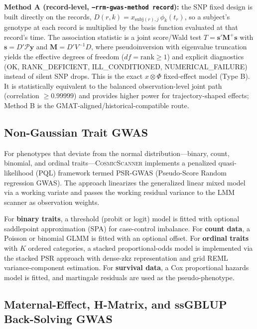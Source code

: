 \documentclass[11pt,a4paper]{article}
\newcommand{\CosmicScanner}{\textsc{CosmicScanner}}
\begin{document}
\textbf{Method A (record-level, \texttt{--rrm-gwas-method record}):} the SNP fixed design is built directly on the records, $D(r,k) = x_{\text{subj}(r),j}\,\phi_k(t_r)$, so a subject's genotype at each record is multiplied by the basis function evaluated at that record's time. The association statistic is a joint score/Wald test $T = \mathbf{s}'\mathbf{M}^{+}\mathbf{s}$ with $\mathbf{s} = D'\mathcal{P}\mathbf{y}$ and $\mathbf{M} = D'V^{-1}D$, where pseudoinversion with eigenvalue truncation yields the effective degrees of freedom ($df = \mathrm{rank} \geq 1$) and explicit diagnostics (OK, RANK\_DEFICIENT, ILL\_CONDITIONED, NUMERICAL\_FAILURE) instead of silent SNP drops. This is the exact $x \otimes \Phi$ fixed-effect model (Type B). It is statistically equivalent to the balanced observation-level joint path (correlation $\geq 0.99999$) and provides higher power for trajectory-shaped effects; Method B is the GMAT-aligned/historical-compatible route.

\subsection{Non-Gaussian Trait GWAS}
\label{sec:non_gaussian}

For phenotypes that deviate from the normal distribution---binary, count, binomial, and ordinal traits---\CosmicScanner{} implements a penalized quasi-likelihood (PQL) framework termed PSR-GWAS (Pseudo-Score Random regression GWAS). The approach linearizes the generalized linear mixed model via a working variate and passes the working residual variance to the LMM scanner as observation weights.

For \textbf{binary traits}, a threshold (probit or logit) model is fitted with optional saddlepoint approximation (SPA) for case-control imbalance. For \textbf{count data}, a Poisson or binomial GLMM is fitted with an optional offset. For \textbf{ordinal traits} with $K$ ordered categories, a stacked proportional-odds model is implemented via the stacked PSR approach with dense-zkz representation and grid REML variance-component estimation. For \textbf{survival data}, a Cox proportional hazards model is fitted, and martingale residuals are used as the pseudo-phenotype.

\subsection{Maternal-Effect, H-Matrix, and ssGBLUP Back-Solving GWAS}
\label{sec:other_models}
\end{document}
